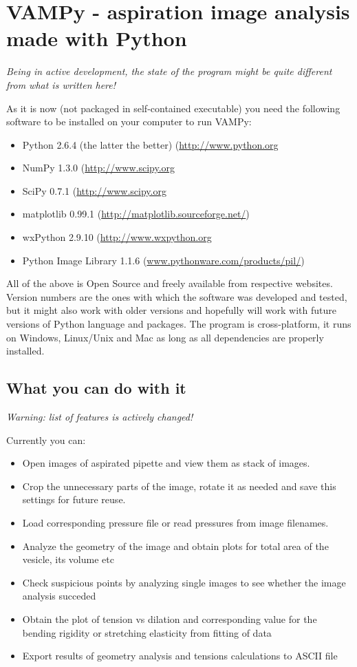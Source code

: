 \section{VAMPy - aspiration image analysis made with Python}\label{vampy}
\emph{Being in active development, the state of the program might be quite different from what is written here!}

As it is now (not packaged in self-contained executable) you need the following software to be installed on your computer to run VAMPy:
\begin{itemize}
	\item Python 2.6.4 (the latter the better) (\url{http://www.python.org}
	\item NumPy 1.3.0 (\url{http://www.scipy.org}
	\item SciPy 0.7.1 (\url{http://www.scipy.org}
	\item matplotlib 0.99.1 (\url{http://matplotlib.sourceforge.net/})
	\item wxPython 2.9.10 (\url{http://www.wxpython.org}
	\item Python Image Library 1.1.6 (\url{www.pythonware.com/products/pil/}) 
\end{itemize}
All of the above is Open Source and freely available from respective websites. Version numbers are the ones with which the software was developed and tested, but it might also work with older versions and hopefully will work with future versions of Python language and packages. The program is cross-platform, it runs on Windows, Linux/Unix and Mac as long as all dependencies are properly installed.

\subsection{What you can do with it}\label{vampy-features}
\emph{Warning: list of features is actively changed!}

Currently you can:
\begin{itemize}
	\item Open images of aspirated pipette and view them as stack of images.
	\item Crop the unnecessary parts of the image, rotate it as needed and save this settings for future reuse.
	\item Load corresponding pressure file or read pressures from image filenames.
	\item Analyze the geometry of the image and obtain plots for total area of the vesicle, its volume etc
	\item Check suspicious points by analyzing single images to see whether the image analysis succeded
	\item Obtain the plot of tension vs dilation and corresponding value for the bending rigidity or stretching elasticity from fitting of data
	\item Export results of geometry analysis and tensions calculations to ASCII file
\end{itemize}

